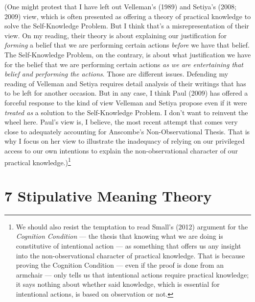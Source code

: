 \documentclass[a4paper,12pt]{article}
\begin{document}
(One might protest that I have left out Velleman's (1989) and Setiya's (2008; 2009) view, which is often presented as offering a theory of practical knowledge to solve the Self-Knowledge Problem. But I think that's a misrepresentation of their view. On my reading, their theory is about explaining our justification for \emph{forming} a belief that we are performing certain actions \emph{before} we have that belief. The Self-Knowledge Problem, on the contrary, is about what justification we have for the belief that we are performing certain actions \emph{as we are entertaining that belief and performing the actions}. Those are different issues. Defending my reading of Velleman and Setiya requires detail analysis of their writings that has to be left for another occasion. But in any case, I think Paul (2009) has offered a forceful response to the kind of view Velleman and Setiya propose even if it were \emph{treated as} a solution to the Self-Knowledge Problem. I don't want to reinvent the wheel here. Paul's view is, I believe, the most recent attempt that comes very close to adequately accounting for Anscombe's Non-Observational Thesis. That is why I focus on her view to illustrate the inadequacy of relying on our privileged access to our own intentions to explain the non-observational character of our practical knowledge.)\footnote{We should also resist the temptation to read Small's (2012) argument for the \emph{Cognition Condition} --- the thesis that knowing what we are doing is constitutive of intentional action --- as something that offers us any insight into the non-observational character of practical knowledge. That is because proving the Cognition Condition --- even if the proof is done from an armchair --- only tells us that intentional actions require practical knowledge; it says nothing about whether said knowledge, which is essential for intentional actions, is based on observation or not.}

\section*{7 Stipulative Meaning Theory}
\end{document}
